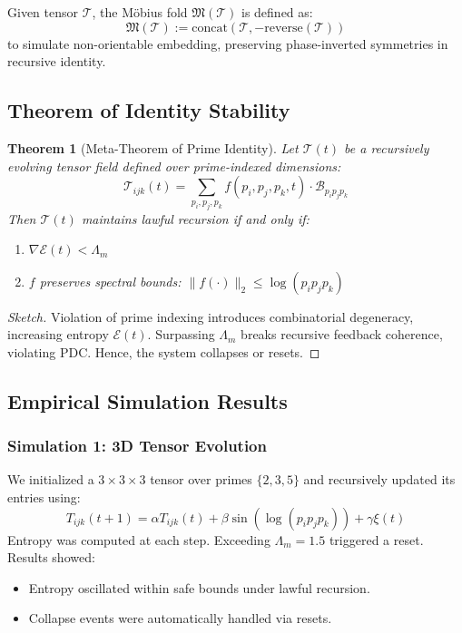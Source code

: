 \documentclass{article}
\theoremstyle{plain}
\newtheorem{theorem}{Theorem}
\begin{document}
\begin{definition}
Given tensor $\mathcal{T}$, the Möbius fold $\mathfrak{M}(\mathcal{T})$ is defined as:
\[
\mathfrak{M}(\mathcal{T}) := \text{concat}(\mathcal{T}, -\text{reverse}(\mathcal{T}))
\]
to simulate non-orientable embedding, preserving phase-inverted symmetries in recursive identity.
\end{definition}

\subsection{Theorem of Identity Stability}

\begin{theorem}[Meta-Theorem of Prime Identity]
Let $\mathcal{T}(t)$ be a recursively evolving tensor field defined over prime-indexed dimensions:
\[
\mathcal{T}_{ijk}(t) = \sum_{p_i, p_j, p_k} f(p_i, p_j, p_k, t) \cdot \mathcal{B}_{p_i p_j p_k}
\]
Then $\mathcal{T}(t)$ maintains lawful recursion if and only if:
\begin{enumerate}
    \item $\nabla \mathcal{E}(t) < \Lambda_m$
    \item $f$ preserves spectral bounds: $\|f(\cdot)\|_2 \leq \log(p_i p_j p_k)$
\end{enumerate}
\end{theorem}

\begin{proof}[Sketch]
Violation of prime indexing introduces combinatorial degeneracy, increasing entropy $\mathcal{E}(t)$. Surpassing $\Lambda_m$ breaks recursive feedback coherence, violating PDC. Hence, the system collapses or resets.
\end{proof}

\subsection{Empirical Simulation Results}

\subsubsection*{Simulation 1: 3D Tensor Evolution}
We initialized a $3 \times 3 \times 3$ tensor over primes $\{2, 3, 5\}$ and recursively updated its entries using:
\[
T_{ijk}(t+1) = \alpha T_{ijk}(t) + \beta \sin(\log(p_i p_j p_k)) + \gamma \xi(t)
\]
Entropy was computed at each step. Exceeding $\Lambda_m = 1.5$ triggered a reset. Results showed:
\begin{itemize}
    \item Entropy oscillated within safe bounds under lawful recursion.
    \item Collapse events were automatically handled via resets.
\end{itemize}
\end{document}
